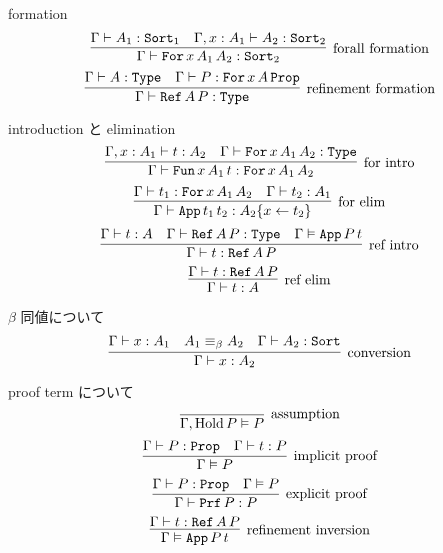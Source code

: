 \begin{itembox}[l]{formation}
  \[\infer[\text{forall formation}]{\Gamma \vdash \texttt{For} \, x \, A_1 \, A_2 : \texttt{Sort}_2}{\Gamma \vdash A_1 : \texttt{Sort}_1 & \Gamma , x : A_1 \vdash A_2 : \texttt{Sort}_2 }\]
  \[\infer[\text{refinement formation}]{\Gamma \vdash \texttt{Ref} \, A \, P : \texttt{Type}}{\Gamma \vdash A : \texttt{Type} & \Gamma \vdash P : \texttt{For} \, x \, A \, \texttt{Prop}}\]
\end{itembox}

\begin{itembox}[l]{introduction と elimination}
  \[\infer[\text{for intro}]{\Gamma \vdash \texttt{Fun} \, x \, A_1 \, t : \texttt{For} \, x \, A_1 \, A_2}{\Gamma , x : A_1 \vdash t : A_2 & \Gamma \vdash \texttt{For} \, x \, A_1 \, A_2 : \texttt{Type}} \]
  \[\infer[\text{for elim}]{\Gamma \vdash \texttt{App} \, t_1 \, t_2 : A_2\{x \leftarrow t_2\}}{\Gamma \vdash t_1 : \texttt{For} \, x \, A_1 \, A_2 & \Gamma \vdash t_2 : A_1} \]
  \[\infer[\text{ref intro}]{\Gamma \vdash t : \texttt{Ref} \, A \, P}{\Gamma \vdash t : A & \Gamma \vdash \texttt{Ref} \, A \, P : \texttt{Type} & \Gamma \vDash \texttt{App} \, P \, t} \]
  \[\infer[\text{ref elim}]{\Gamma \vdash t : A}{\Gamma \vdash t : \texttt{Ref} \, A \, P} \]
\end{itembox}

\begin{itembox}[l]{\(\beta\) 同値について}
  \[\infer[\text{conversion}]{\Gamma \vdash x : A_2}{\Gamma \vdash x : A_1 & A_1 \equiv_{\beta} A_2 & \Gamma \vdash A_2 : \texttt{Sort}} \]
\end{itembox}

\begin{itembox}[l]{proof term について}
  \[\infer[\text{assumption}]{\Gamma , \text{Hold} \, P \vDash P}{}\]
  \[\infer[\text{implicit proof}]{\Gamma \vDash P}{\Gamma \vdash P : \texttt{Prop} & \Gamma \vdash t : P} \]
  \[\infer[\text{explicit proof}]{\Gamma \vdash \texttt{Prf} \, P : P}{\Gamma \vdash P : \texttt{Prop} &\Gamma \vDash P} \]
  \[\infer[\text{refinement inversion}]{\Gamma \vDash \texttt{App} \, P \, t}{\Gamma \vdash t : \texttt{Ref} \, A \, P}\]
\end{itembox}